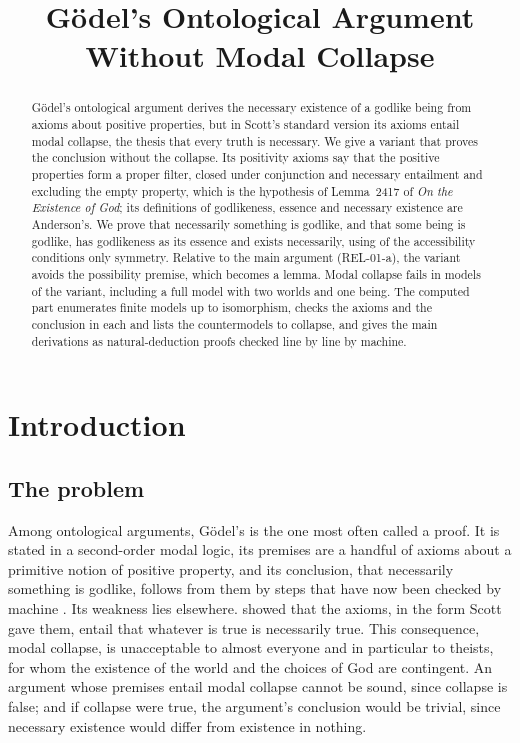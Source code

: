 \documentclass{situationist-preprint}
\title{Gödel's Ontological Argument Without Modal Collapse}
\begin{document}
\maketitle

\begin{abstract}
Gödel's ontological argument derives the necessary existence of a godlike being from axioms about positive properties, but in Scott's standard version its axioms entail modal collapse, the thesis that every truth is necessary. We give a variant that proves the conclusion without the collapse. Its positivity axioms say that the positive properties form a proper filter, closed under conjunction and necessary entailment and excluding the empty property, which is the hypothesis of Lemma~2417 of \emph{On the Existence of God}; its definitions of godlikeness, essence and necessary existence are Anderson's. We prove that necessarily something is godlike, and that some being is godlike, has godlikeness as its essence and exists necessarily, using of the accessibility conditions only symmetry. Relative to the main argument (REL-01-a), the variant avoids the possibility premise, which becomes a lemma. Modal collapse fails in models of the variant, including a full model with two worlds and one being. The computed part enumerates \csModels{} finite models up to isomorphism, checks the axioms and the conclusion in each and lists the countermodels to collapse, and gives the main derivations as natural-deduction proofs checked line by line by machine.
\end{abstract}

\section{Introduction}

\subsection{The problem}

Among ontological arguments, Gödel's is the one most often called a proof. It is stated in a second-order modal logic, its premises are a handful of axioms about a primitive notion of positive property, and its conclusion, that necessarily something is godlike, follows from them by steps that have now been checked by machine \citep{Benzmuller2014}. Its weakness lies elsewhere. \citet{Sobel1987} showed that the axioms, in the form Scott gave them, entail that whatever is true is necessarily true. This consequence, modal collapse, is unacceptable to almost everyone and in particular to theists, for whom the existence of the world and the choices of God are contingent. An argument whose premises entail modal collapse cannot be sound, since collapse is false; and if collapse were true, the argument's conclusion would be trivial, since necessary existence would differ from existence in nothing.
\end{document}
